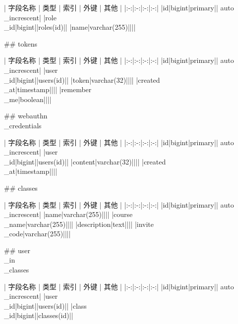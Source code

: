 \documentclass{ctexart}
\begin{document}
\begin{markdown}
\begin{center}
| 字段名称 | 类型 | 索引 | 外键 | 其他 |
|:-:|:-:|:-:|:-:|
|id|bigint|primary|| auto\\\_increscent|
|role\\\_id|bigint||roles(id)||
|name|varchar(255)||||

\end{center}

## tokens

\begin{center}

| 字段名称 | 类型 | 索引 | 外键 | 其他 |
|:-:|:-:|:-:|:-:|
|id|bigint|primary|| auto\\\_increscent|
|user\\\_id|bigint||users(id)||
|token|varchar(32)||||
|created\\\_at|timestamp||||
|remember\\\_me|boolean||||


\end{center}

## webauthn\\\_credentials

\begin{center}

| 字段名称 | 类型 | 索引 | 外键 | 其他 |
|:-:|:-:|:-:|:-:|
|id|bigint|primary|| auto\\\_increscent|
|user\\\_id|bigint||users(id)||
|content|varchar(32)||||
|created\\\_at|timestamp||||

\end{center}

## classes

\begin{center}

| 字段名称 | 类型 | 索引 | 外键 | 其他 |
|:-:|:-:|:-:|:-:|
|id|bigint|primary|| auto\\\_increscent|
|name|varchar(255)||||
|course\\\_name|varchar(255)||||
|description|text||||
|invite\\\_code|varchar(255)||||

\end{center}

## user\\\_in\\\_classes

\begin{center}

| 字段名称 | 类型 | 索引 | 外键 | 其他 |
|:-:|:-:|:-:|:-:|
|id|bigint|primary|| auto\\\_increscent|
|user\\\_id|bigint||users(id)||
|class\\\_id|bigint||classes(id)||


\end{center}
\end{markdown}
\end{document}
